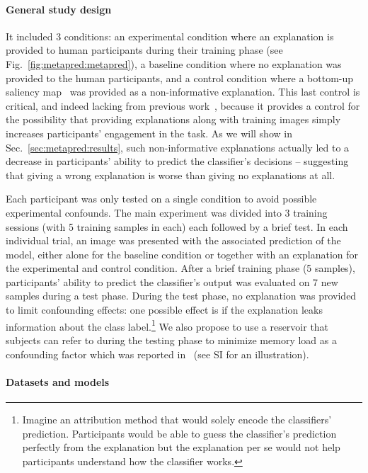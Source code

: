 \paragraph{General study design}

It included 3 conditions: an experimental condition where an explanation is provided to human participants during their training phase (see Fig.~\ref{fig:metapred:metapred}), a baseline condition where no explanation was provided to the human participants, and a control condition where a bottom-up saliency map~\cite{itti2005bottomup} was provided as a non-informative explanation. This last control is critical, and indeed lacking from previous work~\cite{hase2020evaluating, ribeiro2016lime}, because it  provides a control for the possibility that providing explanations along with training images simply increases participants' engagement in the task. As we will show in Sec.~\ref{sec:metapred:results}, such non-informative explanations actually led to a decrease in participants' ability to predict the classifier's decisions -- suggesting that giving a wrong explanation is worse than giving no explanations at all.


Each participant was only tested on a single condition to avoid possible experimental confounds. 
The main experiment was divided into 3 training sessions (with 5 training samples in each) each followed by a brief test. In each individual trial, an image was presented with the associated prediction of the model, either alone for the baseline condition or together with an explanation for the experimental and control condition. After a brief training phase (5 samples), participants' ability to predict the classifier's output was evaluated on 7 new samples during a test phase. During the test phase, no explanation was provided to limit confounding effects: one possible effect is if the explanation leaks information about the class label.\footnote{Imagine an attribution method that would solely encode the classifiers' prediction. Participants would be able to guess the classifier's prediction perfectly from the explanation but the explanation per se would not help participants understand how the classifier works.}
We also propose to use a reservoir that subjects can refer to during the testing phase to minimize memory load as a confounding factor which was reported in~\cite{hase2020evaluating} (see SI for an illustration).

\paragraph{Datasets and models} 

